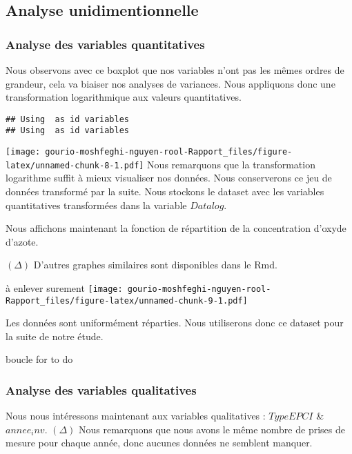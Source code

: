 \documentclass[
]{article}
\begin{document}
\hypertarget{analyse-unidimentionnelle}{%
\subsection{Analyse unidimentionnelle}\label{analyse-unidimentionnelle}}

\hypertarget{analyse-des-variables-quantitatives}{%
\subsubsection{Analyse des variables
quantitatives}\label{analyse-des-variables-quantitatives}}

Nous observons avec ce boxplot que nos variables n'ont pas les mêmes
ordres de grandeur, cela va biaiser nos analyses de variances. Nous
appliquons donc une transformation logarithmique aux valeurs
quantitatives.

\begin{verbatim}
## Using  as id variables
## Using  as id variables
\end{verbatim}

\texttt{[image: gourio-moshfeghi-nguyen-rool-Rapport\_files/figure-latex/unnamed-chunk-8-1.pdf]}
Nous remarquons que la transformation logarithme suffit à mieux
visualiser nos données. Nous conserverons ce jeu de données transformé
par la suite. Nous stockons le dataset avec les variables quantitatives
transformées dans la variable \(Datalog\).

Nous affichons maintenant la fonction de répartition de la concentration
d'oxyde d'azote.

\((\Delta)\) D'autres graphes similaires sont disponibles dans le Rmd.

à enlever surement
\texttt{[image: gourio-moshfeghi-nguyen-rool-Rapport\_files/figure-latex/unnamed-chunk-9-1.pdf]}

Les données sont uniformément réparties. Nous utiliserons donc ce
dataset pour la suite de notre étude.

boucle for to do

\hypertarget{analyse-des-variables-qualitatives}{%
\subsubsection{Analyse des variables
qualitatives}\label{analyse-des-variables-qualitatives}}

Nous nous intéressons maintenant aux variables qualitatives :
\(TypeEPCI\) \& \(annee_inv\). \((\Delta)\) Nous remarquons que nous
avons le même nombre de prises de mesure pour chaque année, donc aucunes
données ne semblent manquer.
\end{document}
